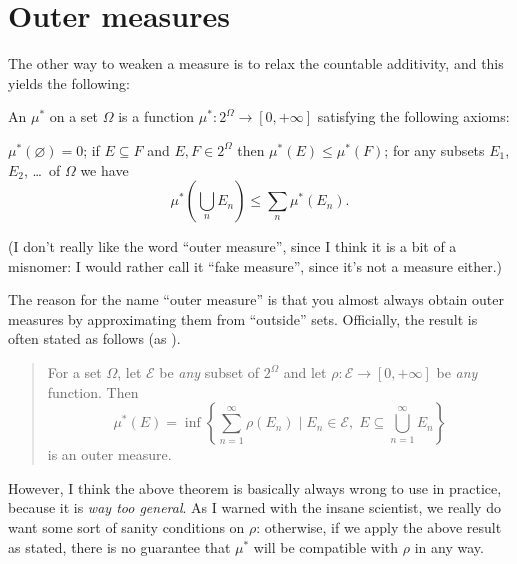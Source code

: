 \section{Outer measures}
The other way to weaken a measure is to relax the countable additivity,
and this yields the following:
\begin{definition}
	An  $\mu^\ast$ on a set $\Omega$
	is a function $\mu^\ast \colon 2^\Omega \to [0, +\infty]$
	satisfying the following axioms:
	\begin{itemize}
		\ii $\mu^\ast(\varnothing) = 0$;
		\ii if $E \subseteq F$ and $E,F \in 2^{\Omega}$
		then $\mu^\ast(E) \le \mu^\ast(F)$;
		\ii for any subsets $E_1$, $E_2$, \dots\ of $\Omega$ we have
		\[ \mu^\ast \left( \bigcup_n E_n \right)
			\le \sum_n \mu^\ast(E_n). \]
	\end{itemize}
	(I don't really like the word ``outer measure'',
	since I think it is a bit of a misnomer:
	I would rather call it ``fake measure'',
	since it's not a measure either.)
\end{definition}

The reason for the name ``outer measure''
is that you almost always obtain outer measures
by approximating them from ``outside'' sets.
Officially, the result is often stated as follows
(as ).
\begin{quote}
	For a set $\Omega$, let $\mathcal{E}$ be \emph{any} subset of $2^{\Omega}$
	and let $\rho \colon \mathcal{E} \to [0,+\infty]$ be \emph{any} function.
	Then
	\[ \mu^\ast(E) = \inf \left\{ \sum_{n=1}^\infty \rho(E_n) \mid
		E_n \in \mathcal{E}, \;
		E \subseteq \bigcup_{n=1}^\infty E_n \right\} \]
	is an outer measure.
\end{quote}

However, I think the above theorem is basically always
wrong to use in practice, because it is \emph{way too general}.
As I warned with the insane scientist,
we really do want some sort of sanity conditions on $\rho$:
otherwise, if we apply the above result as stated,
there is no guarantee that $\mu^\ast$ will
be compatible with $\rho$ in any way.


